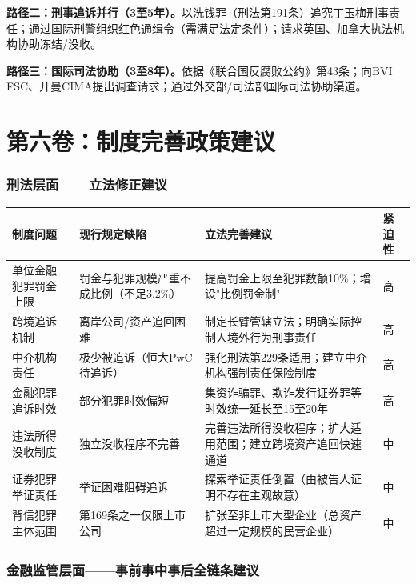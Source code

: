 \documentclass[11pt,a4paper,oneside,openany]{article}
\begin{document}
\textbf{路径二：刑事追诉并行（3至5年）。}以洗钱罪（刑法第191条）追究丁玉梅刑事责任；通过国际刑警组织红色通缉令（需满足法定条件）；请求英国、加拿大执法机构协助冻结/没收。

\textbf{路径三：国际司法协助（3至8年）。}依据《联合国反腐败公约》第43条；向BVI FSC、开曼CIMA提出调查请求；通过外交部/司法部国际司法协助渠道。

\newpage
\part{第六卷：制度完善政策建议}

\section{刑法层面——立法修正建议}
\begin{threeparttable}
\caption{刑法制度完善立法建议矩阵}
\begin{tabular}{p{2.3cm}p{3.5cm}p{4.5cm}p{1.5cm}}
\toprule
\textbf{制度问题} & \textbf{现行规定缺陷} & \textbf{立法完善建议} & \textbf{紧迫性} \\
\midrule
单位金融犯罪罚金上限 & 罚金与犯罪规模严重不成比例（不足3.2\%） & 提高罚金上限至犯罪数额10\%；增设"比例罚金制" & 高 \\
跨境追诉机制 & 离岸公司/资产追回困难 & 制定长臂管辖立法；明确实际控制人境外行为刑事责任 & 高 \\
中介机构责任 & 极少被追诉（恒大PwC待追诉） & 强化刑法第229条适用；建立中介机构强制责任保险制度 & 高 \\
金融犯罪追诉时效 & 部分犯罪时效偏短 & 集资诈骗罪、欺诈发行证券罪等时效统一延长至15至20年 & 高 \\
违法所得没收制度 & 独立没收程序不完善 & 完善违法所得没收程序；扩大适用范围；建立跨境资产追回快速通道 & 中 \\
证券犯罪举证责任 & 举证困难阻碍追诉 & 探索举证责任倒置（由被告人证明不存在主观故意） & 中 \\
背信犯罪主体范围 & 第169条之一仅限上市公司 & 扩张至非上市大型企业（总资产超过一定规模的民营企业） & 中 \\
\bottomrule
\end{tabular}
\end{threeparttable}

\section{金融监管层面——事前事中事后全链条建议}
\end{document}
